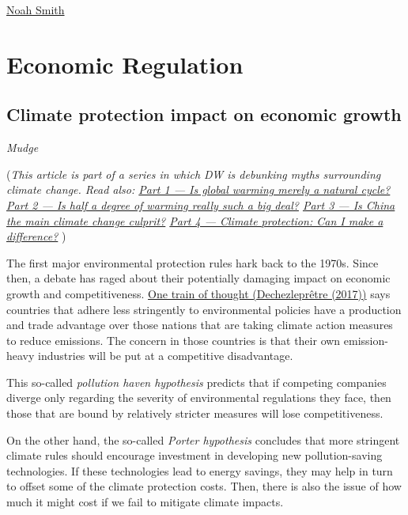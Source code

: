 \documentclass[
]{book}
\begin{document}
\href{https://noahpinion.substack.com/p/answering-the-techno-pessimists-complete}{Noah Smith}

\hypertarget{economic-regulation}{%
\chapter{Economic Regulation}\label{economic-regulation}}

\hypertarget{climate-protection-impact-on-economic-growth}{%
\section{Climate protection impact on economic growth}\label{climate-protection-impact-on-economic-growth}}

\emph{Mudge}

(\emph{This article is part of a series in which DW is debunking myths surrounding climate change.
Read also:
\href{https://www.dw.com/en/fact-check-is-global-warming-merely-a-natural-cycle/a-57831350}{Part 1 --- Is global warming merely a natural cycle?}
\href{https://www.dw.com/en/fact-check-is-half-a-degree-of-warming-really-such-a-big-deal-for-the-planet/a-57859167}{Part 2 --- Is half a degree of warming really such a big deal?}
\href{https://www.dw.com/en/fact-check-is-china-the-main-climate-change-culprit/a-57777113}{Part 3 --- Is China the main climate change culprit?}
\href{https://www.dw.com/en/fact-check-what-can-i-do-for-climate-protection/a-57980888}{Part 4 --- Climate protection: Can I make a difference?} })

The first major environmental protection rules hark back to the 1970s. Since then, a debate has raged about their potentially damaging impact on economic growth and competitiveness.
\href{https://www.journals.uchicago.edu/doi/pdf/10.1093/reep/rex013}{One train of thought (Dechezleprêtre (2017))} says countries that adhere less stringently to environmental policies have a production and trade advantage over those nations that are taking climate action measures to reduce emissions. The concern in those countries is that their own emission-heavy industries will be put at a competitive disadvantage.

This so-called \emph{pollution haven hypothesis} predicts that if competing companies diverge only regarding the severity of environmental regulations they face, then those that are bound by relatively stricter
measures will lose competitiveness.

On the other hand, the so-called \emph{Porter hypothesis} concludes that more stringent climate rules should encourage investment in developing new pollution-saving technologies. If these technologies lead to energy savings, they may help in turn to offset some of the climate protection costs. Then, there is also the issue of how much it might cost if we fail to mitigate climate impacts.
\end{document}
